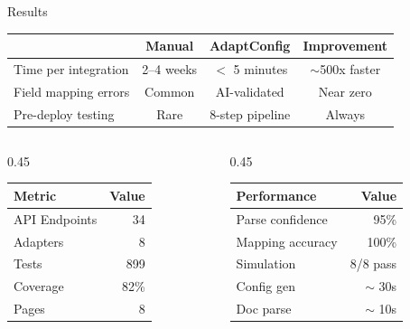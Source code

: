 \documentclass[aspectratio=169,11pt]{beamer}
\begin{document}
\begin{frame}{Results}
\begin{center}
{\small
\begin{tabular}{lccc}
\toprule
& \textbf{Manual} & \textbf{AdaptConfig} & \textbf{Improvement} \\
\midrule
Time per integration & 2--4 weeks & $<$ 5 minutes & \textcolor{ok}{$\sim$500x faster} \\
Field mapping errors & Common & AI-validated & \textcolor{ok}{Near zero} \\
Pre-deploy testing & Rare & 8-step pipeline & \textcolor{ok}{Always} \\
\bottomrule
\end{tabular}
}
\end{center}

\vspace{0.5em}
\begin{columns}
\begin{column}{0.45\textwidth}
\centering
{\small
\begin{tabular}{lr}
\toprule
\textbf{Metric} & \textbf{Value} \\
\midrule
API Endpoints & 34 \\
Adapters & 8 \\
Tests & 899 \\
Coverage & 82\% \\
Pages & 8 \\
\bottomrule
\end{tabular}
}
\end{column}
\begin{column}{0.45\textwidth}
\centering
{\small
\begin{tabular}{lr}
\toprule
\textbf{Performance} & \textbf{Value} \\
\midrule
Parse confidence & 95\% \\
Mapping accuracy & 100\% \\
Simulation & 8/8 pass \\
Config gen & $\sim$ 30s \\
Doc parse & $\sim$ 10s \\
\bottomrule
\end{tabular}
}
\end{column}
\end{columns}
\end{frame}
\end{document}
